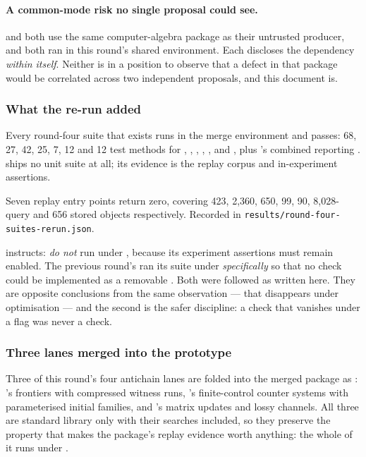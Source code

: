 \paragraph{A common-mode risk no single proposal could see.}  and
 both use the same computer-algebra package as their untrusted
producer, and both ran in this round's shared environment. Each discloses the
dependency \emph{within itself}. Neither is in a position to observe that a
defect in that package would be correlated across two independent proposals,
and this document is.

\subsubsection*{What the re-run added}

Every round-four suite that exists runs in the merge environment and passes:
68, 27, 42, 25, 7, 12 and 12 test methods for , , ,
, ,  and , plus 's combined
 reporting .  ships no unit suite
at all; its evidence is the replay corpus and in-experiment assertions.

Seven replay entry points return zero, covering 423, 2{,}360, 650, 99, 90,
8{,}028-query and 656 stored objects respectively. Recorded in
\texttt{results/round-four-suites-rerun.json}.

\begin{remark}
 instructs: \emph{do not} run under , because its
experiment assertions must remain enabled. The previous round's  ran
its suite under  \emph{specifically} so that no check could be
implemented as a removable . Both were followed as written here.
They are opposite conclusions from the same observation --- that 
disappears under optimisation --- and the second is the safer discipline: a
check that vanishes under a flag was never a check.
\end{remark}

\subsubsection*{Three lanes merged into the prototype}

Three of this round's four antichain lanes are folded into the merged package
as : 's frontiers with compressed witness runs,
's finite-control counter systems with parameterised initial families,
and 's matrix updates and lossy channels. All three are standard
library only with their searches included, so they preserve the property that
makes the package's replay evidence worth anything: the whole of it runs under
.

